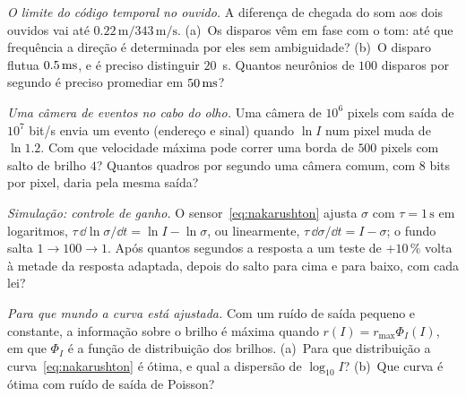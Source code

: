 \begin{exercise}[\lvlB]
\label{ex:11:4}
\emph{O limite do código temporal no ouvido.} A diferença de chegada do som aos dois ouvidos vai até $0.22\,\text{m}/343\,\text{m/s}$. (a)~Os disparos vêm em fase com o tom: até que frequência a direção é determinada por eles sem ambiguidade? (b)~O disparo flutua $0.5\,\text{ms}$, e é preciso distinguir $20$~\textmu s. Quantos neurônios de $100$ disparos por segundo é preciso promediar em $50\,\text{ms}$?
\end{exercise}

\begin{exercise}[\lvlB]
\label{ex:11:5}
\emph{Uma câmera de eventos no cabo do olho.} Uma câmera de $10^6$ pixels com saída de $10^7$ bit/s envia um evento (endereço e sinal) quando $\ln I$ num pixel muda de $\ln1.2$. Com que velocidade máxima pode correr uma borda de $500$ pixels com salto de brilho $4$? Quantos quadros por segundo uma câmera comum, com $8$ bits por pixel, daria pela mesma saída?
\end{exercise}

\begin{exercise}[\lvlB]
\label{ex:11:6}
\emph{Simulação: controle de ganho.} O sensor~\eqref{eq:nakarushton} ajusta $\sigma$ com $\tau=1\,\text{s}$ em logaritmos, $\tau\,\dd\ln\sigma/\dd t=\ln I-\ln\sigma$, ou linearmente, $\tau\,\dd\sigma/\dd t=I-\sigma$; o fundo salta $1\to100\to1$. Após quantos segundos a resposta a um teste de $+10\,\%$ volta à metade da resposta adaptada, depois do salto para cima e para baixo, com cada lei?
\end{exercise}

\begin{exercise}[\lvlC]
\label{ex:11:7}
\emph{Para que mundo a curva está ajustada.} Com um ruído de saída pequeno e constante, a informação sobre o brilho é máxima quando $r(I)=r_{\max}\Phi_I(I)$, em que $\Phi_I$ é a função de distribuição dos brilhos. (a)~Para que distribuição a curva~\eqref{eq:nakarushton} é ótima, e qual a dispersão de $\log_{10}I$? (b)~Que curva é ótima com ruído de saída de Poisson?
\end{exercise}
